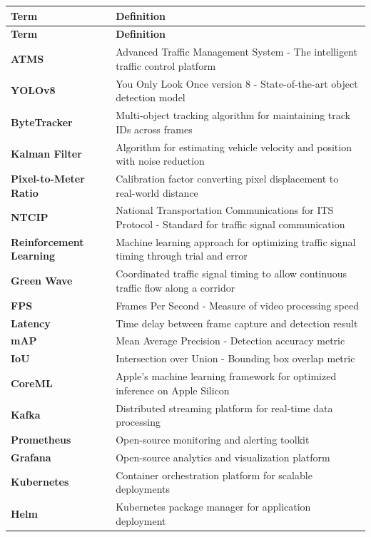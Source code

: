 \documentclass[12pt,a4paper]{article}
\begin{document}
\begin{longtable}{|p{4cm}|p{10cm}|}
\hline
\textbf{Term} & \textbf{Definition} \\
\hline
\endfirsthead
\hline
\textbf{Term} & \textbf{Definition} \\
\hline
\endhead
\textbf{ATMS} & Advanced Traffic Management System - The intelligent traffic control platform \\
\textbf{YOLOv8} & You Only Look Once version 8 - State-of-the-art object detection model \\
\textbf{ByteTracker} & Multi-object tracking algorithm for maintaining track IDs across frames \\
\textbf{Kalman Filter} & Algorithm for estimating vehicle velocity and position with noise reduction \\
\textbf{Pixel-to-Meter Ratio} & Calibration factor converting pixel displacement to real-world distance \\
\textbf{NTCIP} & National Transportation Communications for ITS Protocol - Standard for traffic signal communication \\
\textbf{Reinforcement Learning} & Machine learning approach for optimizing traffic signal timing through trial and error \\
\textbf{Green Wave} & Coordinated traffic signal timing to allow continuous traffic flow along a corridor \\
\textbf{FPS} & Frames Per Second - Measure of video processing speed \\
\textbf{Latency} & Time delay between frame capture and detection result \\
\textbf{mAP} & Mean Average Precision - Detection accuracy metric \\
\textbf{IoU} & Intersection over Union - Bounding box overlap metric \\
\textbf{CoreML} & Apple's machine learning framework for optimized inference on Apple Silicon \\
\textbf{Kafka} & Distributed streaming platform for real-time data processing \\
\textbf{Prometheus} & Open-source monitoring and alerting toolkit \\
\textbf{Grafana} & Open-source analytics and visualization platform \\
\textbf{Kubernetes} & Container orchestration platform for scalable deployments \\
\textbf{Helm} & Kubernetes package manager for application deployment \\

\end{longtable}
\end{document}
